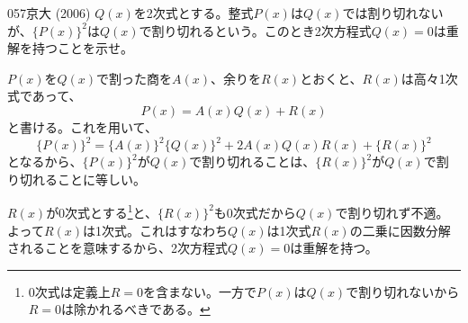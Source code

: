 \begin{prob}{057}{}{京大 (2006)}
 $Q(x)$を2次式とする。整式$P(x)$は$Q(x)$では割り切れないが、$\{P(x)\}^2$は$Q(x)$で割り切れるという。このとき2次方程式$Q(x)=0$は重解を持つことを示せ。
\end{prob}
$P(x)$を$Q(x)$で割った商を$A(x)$、余りを$R(x)$とおくと、$R(x)$は高々1次式であって、
\[ P(x)=A(x)Q(x)+R(x) \]
と書ける。これを用いて、
\[ \{P(x)\}^2=\{A(x)\}^2\{Q(x)\}^2+2A(x)Q(x)R(x)+\{R(x)\}^2 \]
となるから、$\{P(x)\}^2$が$Q(x)$で割り切れることは、$\{R(x)\}^2$が$Q(x)$で割り切れることに等しい。

$R(x)$が0次式とする\footnote{0次式は定義上$R=0$を含まない。一方で$P(x)$は$Q(x)$で割り切れないから$R=0$は除かれるべきである。}と、$\{R(x)\}^2$も0次式だから$Q(x)$で割り切れず不適。よって$R(x)$は1次式。これはすなわち$Q(x)$は1次式$R(x)$の二乗に因数分解されることを意味するから、2次方程式$Q(x)=0$は重解を持つ。